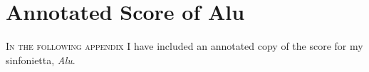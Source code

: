 \chapter{Annotated Score of Alu}
\label{AppendixG}

\lettrine[lines=2,slope=-2pt,nindent=2pt]{\textcolor{SchoolColor}{I}}{n the following appendix} I have included an annotated copy of the score for my sinfonietta, \textit{Alu}.


